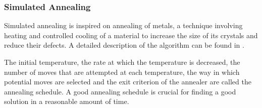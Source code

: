 \documentclass[a4paper,oneside,12pt]{article}
\begin{document}

\subsubsection{Simulated Annealing}
Simulated annealing \cite{kirkpatrick1983obsa} is inspired on annealing of metals, a technique involving heating and controlled cooling of a material to increase the size of its crystals and reduce their defects.
A detailed description of the algorithm can be found in \cite{kravitz1987placement}.

The initial temperature, the rate at which the temperature is decreased, the number of moves that are attempted at each temperature, the way in which potential moves are selected and the exit criterion of the annealer are called the annealing schedule. A good annealing schedule is crucial for finding a good solution in a reasonable amount of time.
\end{document}
